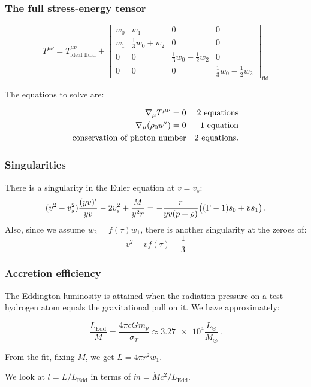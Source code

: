 \documentclass{beamer}
\begin{document}
\begin{frame}
    \frametitle{The full stress-energy tensor}

    \begin{equation*}
    T^{\mu\nu} =
    T^{\mu\nu}_{\text{ideal fluid}} +
    \begin{bmatrix}
    w_0   & w_1  & 0  & 0 \\
    w_1   & \frac{1}{3}w_0 + w_2  &  0  & 0 \\
      0 & 0  &  \frac{1}{3}w_0 -\frac{1}{2}w_2 & 0 \\
      0 & 0  &  0 & \frac{1}{3}w_0 -\frac{1}{2}w_2
    \end{bmatrix} _{\text{fid}}
    \end{equation*}

    The equations to solve are:

    \begin{subequations}
    \begin{align*}
      \nabla_\mu T^{\mu\nu} = 0 && \text{2 equations} \\
      \nabla_\mu \qty(\rho_0 u^\mu) = 0&& \text{1 equation} \\
      \text{conservation of photon number} && \text{2 equations.}
    \end{align*}
    \end{subequations}
\end{frame}

\begin{frame}
    \frametitle{Singularities}
    There is a singularity in the Euler equation at \(v = v_s\):
        \begin{equation*}
        (v^2 - v_s^2) \frac{(yv) ^{\prime}}{yv} - 2 v_s^2 + \frac{M}{y^2 r}
        = -\frac{r}{yv (p + \rho)} \qty((\Gamma-1)s_0 + v s_1)\,.
        \end{equation*}
    Also, since we assume \(w_2 = f(\tau) w_1\), there is another singularity at the zeroes of:
    \begin{equation*}
        v^2 - v f(\tau) - \frac{1}{3}
    \end{equation*}
\end{frame}

\begin{frame}
    \frametitle{Accretion efficiency}
    The Eddington luminosity is attained when the radiation pressure on a test hydrogen atom equals the gravitational pull on it. We have approximately:

    \begin{equation*}
        \frac{L_{\text{Edd}}}{M} = \frac{4 \pi c G m_p}{\sigma_T} \approx \num{3.27e4} \frac{L_{\odot}}{M_{\odot}}  \,.
    \end{equation*}

    From the fit, fixing \(\dot{M}\), we get \(L = 4 \pi r^2 w_1\).

    We look at \(l = L / L_{\text{Edd}}\) in terms of \(\dot{m} = \dot{M} c^2 / L_{\text{Edd}}\).
\end{frame}
\end{document}
